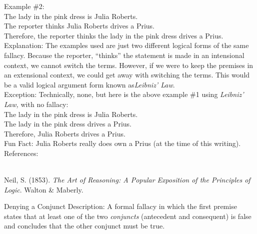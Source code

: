 \documentclass[a4paper,12pt,single,pdftex]{scrbook}
\begin{document}
    
      Example \#2:
    \\

    
      The lady in the pink dress is Julia Roberts.
    \\

    
      The reporter thinks Julia Roberts drives a Prius.
    \\

    
      Therefore, the reporter thinks the lady in the pink dress drives a Prius.
    \\

    
      Explanation: The examples used are just two different logical forms of the same fallacy.  Because the reporter, “thinks” the statement is made in an intensional context, we cannot switch the terms.  However, if we were to keep the premises in an extensional context, we could get away with switching the terms.  This would be a valid logical argument form known as{\it  Leibniz’ Law}.
    \\

    
      Exception: Technically, none, but here is the above example \#1 using {\it Leibniz’ Law, }with no fallacy:
    \\

    
      The lady in the pink dress is Julia Roberts.
    \\

    
      The lady in the pink dress drives a Prius.
    \\

    
      Therefore, Julia Roberts drives a Prius.
    \\

    
      Fun Fact: Julia Roberts really does own a Prius (at the time of this writing).
    \\

    References:

    
      
        
      \\

      
        
          Neil, S. (1853). {\it The Art of Reasoning: A Popular Exposition of the Principles of Logic}. Walton \& Maberly.
        
      
    
  

Denying a Conjunct
    Description: A formal fallacy in which the first premise states that at least one of the two {\it conjuncts} (antecedent and consequent) is false and concludes that the other conjunct must be true.
\end{document}
